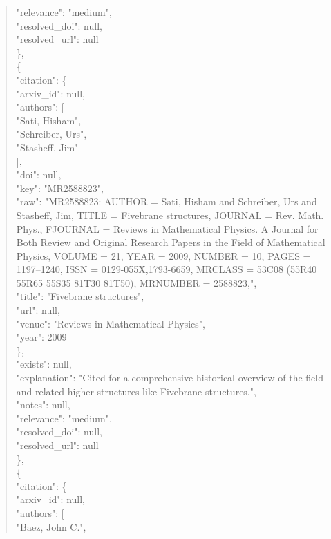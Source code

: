 \documentclass[11pt]{article}
\begin{document}
\begin{quote}
      "relevance": "medium",\\
      "resolved\_doi": null,\\
      "resolved\_url": null\\
    \},\\
    \{\\
      "citation": \{\\
        "arxiv\_id": null,\\
        "authors": [\\
          "Sati, Hisham",\\
          "Schreiber, Urs",\\
          "Stasheff, Jim"\\
        ],\\
        "doi": null,\\
        "key": "MR2588823",\\
        "raw": "MR2588823: AUTHOR = Sati, Hisham and Schreiber, Urs and Stasheff, Jim, TITLE = Fivebrane structures, JOURNAL = Rev. Math. Phys., FJOURNAL = Reviews in Mathematical Physics. A Journal for Both Review and Original Research Papers in the Field of Mathematical Physics, VOLUME = 21, YEAR = 2009, NUMBER = 10, PAGES = 1197--1240, ISSN = 0129-055X,1793-6659, MRCLASS = 53C08 (55R40 55R65 55S35 81T30 81T50), MRNUMBER = 2588823,",\\
        "title": "Fivebrane structures",\\
        "url": null,\\
        "venue": "Reviews in Mathematical Physics",\\
        "year": 2009\\
      \},\\
      "exists": null,\\
      "explanation": "Cited for a comprehensive historical overview of the field and related higher structures like Fivebrane structures.",\\
      "notes": null,\\
      "relevance": "medium",\\
      "resolved\_doi": null,\\
      "resolved\_url": null\\
    \},\\
    \{\\
      "citation": \{\\
        "arxiv\_id": null,\\
        "authors": [\\
          "Baez, John C.",\\

\end{quote}
\end{document}
